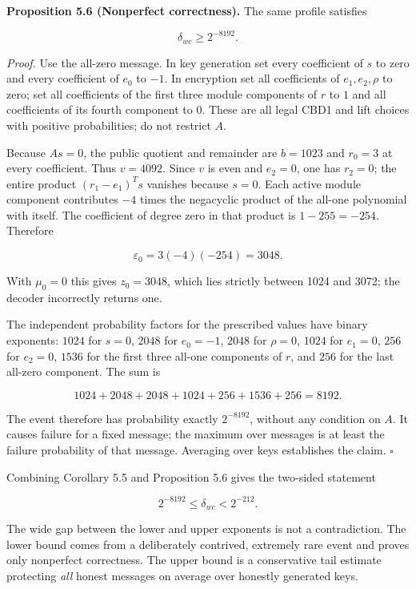 \documentclass[
  11pt,
  a4paper,
  oneside]{report}
\begin{document}
\textbf{Proposition 5.6 (Nonperfect correctness).} The same profile
satisfies

\[
\boxed{\quad\delta_{wc}\ge2^{-8192}.\quad}
\]

\emph{Proof.} Use the all-zero message. In key generation set every
coefficient of \(s\) to zero and every coefficient of \(e_0\) to \(-1\).
In encryption set all coefficients of \(e_1,e_2,\rho\) to zero; set all
coefficients of the first three module components of \(r\) to \(1\) and
all coefficients of its fourth component to \(0\). These are all legal
CBD1 and lift choices with positive probabilities; do not restrict
\(A\).

Because \(As=0\), the public quotient and remainder are \(b=1023\) and
\(r_0=3\) at every coefficient. Thus \(v=4092\). Since \(v\) is even and
\(e_2=0\), one has \(r_2=0\); the entire product \((r_1-e_1)^Ts\)
vanishes because \(s=0\). Each active module component contributes
\(-4\) times the negacyclic product of the all-one polynomial with
itself. The coefficient of degree zero in that product is
\(1-255=-254\). Therefore

\[
\varepsilon_0=3(-4)(-254)=3048.
\]

With \(\mu_0=0\) this gives \(z_0=3048\), which lies strictly between
1024 and 3072; the decoder incorrectly returns one.

The independent probability factors for the prescribed values have
binary exponents: \(1024\) for \(s=0\), \(2048\) for \(e_0=-1\),
\(2048\) for \(\rho=0\), \(1024\) for \(e_1=0\), \(256\) for \(e_2=0\),
\(1536\) for the first three all-one components of \(r\), and \(256\)
for the last all-zero component. The sum is

\[
1024+2048+2048+1024+256+1536+256=8192.
\]

The event therefore has probability exactly \(2^{-8192}\), without any
condition on \(A\). It causes failure for a fixed message; the maximum
over messages is at least the failure probability of that message.
Averaging over keys establishes the claim. \(\square\)

Combining Corollary 5.5 and Proposition 5.6 gives the two-sided
statement

\[
\boxed{\qquad 2^{-8192}\le\delta_{wc}<2^{-212}.\qquad}
\]

The wide gap between the lower and upper exponents is not a
contradiction. The lower bound comes from a deliberately contrived,
extremely rare event and proves only nonperfect correctness. The upper
bound is a conservative tail estimate protecting \emph{all} honest
messages on average over honestly generated keys.
\end{document}
